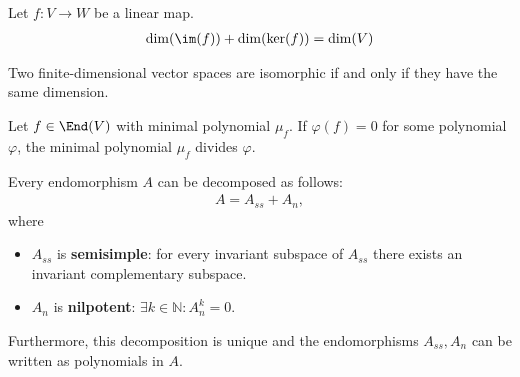
    \begin{theorem}\label{linalgebra:dimension_theorem}
        Let $f:V\rightarrow W$ be a linear map.
        \begin{gather}
            \dim(\im(f)) + \dim(\ker(f)) = \dim(V)
        \end{gather}
    \end{theorem}
    \begin{result}\label{linalgebra:dimension_isomorphism}
        Two finite-dimensional vector spaces are isomorphic if and only if they have the same dimension.
    \end{result}

    \begin{property}\label{linalgebra:minimal_polynomial_divisor}
        Let $f\in\End(V)$ with minimal polynomial $\mu_f$. If $\varphi(f) = 0$ for some polynomial $\varphi$, the minimal polynomial $\mu_f$ divides $\varphi$.
    \end{property}

    \begin{property}\label{linalgebra:jordan_chevalley}
        Every endomorphism $A$ can be decomposed as follows:
        \begin{gather}
            A = A_{ss} + A_n,
        \end{gather}
        where
        \begin{itemize}
            \item $A_{ss}$ is \textbf{semisimple}: for every invariant subspace of $A_{ss}$ there exists an invariant complementary subspace.
            \item $A_n$ is \textbf{nilpotent}: $\exists k\in\mathbb{N}:A_n^k = 0$.
        \end{itemize}
        Furthermore, this decomposition is unique and the endomorphisms $A_{ss},A_n$ can be written as polynomials in $A$.
    \end{property}

